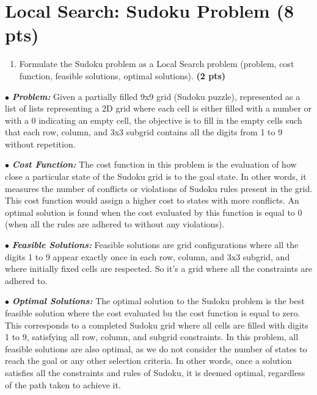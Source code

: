 \documentclass[11pt,a4paper]{report}
\begin{document}
\section{Local Search: Sudoku Problem (8 pts)}

\begin{enumerate}
    \item Formulate the Sudoku problem as a Local Search problem (problem, cost function, feasible solutions, optimal solutions). \textbf{(2 pts)}
\end{enumerate}

\begin{answer}
\tiny{
$\bullet$ \textbf{\textit{Problem:}} Given a partially filled 9x9 grid (Sudoku puzzle), represented as a list of lists representing a 2D grid where each cell is either filled with a number or with a 0 indicating an empty cell, the objective is to fill in the empty cells such that each row, column, and 3x3 subgrid contains all the digits from 1 to 9 without repetition.

$\bullet$ \textbf{\textit{Cost Function:}} The cost function in this problem is the evaluation of how close a particular state of the Sudoku grid is to the goal state. In other words, it measures the number of conflicts or violations of Sudoku rules present in the grid. This cost function would assign a higher cost to states with more conflicts. An optimal solution is found when the cost evaluated by this function is equal to 0 (when all the rules are adhered to without any violations).

$\bullet$ \textbf{\textit{Feasible Solutions:}} Feasible solutions are grid configurations where all the digits 1 to 9 appear exactly once in each row, column, and 3x3 subgrid, and where initially fixed cells are respected. So it's a grid where all the constraints are adhered to.

$\bullet$ \textbf{\textit{Optimal Solutions:}} The optimal solution to the Sudoku problem is the best feasible solution where the cost evaluated bu the cost function is equal to zero. This corresponds to a completed Sudoku grid where all cells are filled with digits 1 to 9, satisfying all row, column, and subgrid constraints. In this problem, all feasible solutions are also optimal, as we do not consider the number of states to reach the goal or any other selection criteria. In other words, once a solution satisfies all the constraints and rules of Sudoku, it is deemed optimal, regardless of the path taken to achieve it.}
\end{answer}
\end{document}
